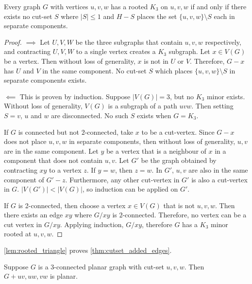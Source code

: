 \begin{lemma}\label{lem:rooted_triangle}
	Every graph $G$ with vertices $u, v, w$ has a rooted $K_3$ on $u, v, w$ if and only if there exists no cut-set $S$ where $|S| \leq 1$ and $H - S$ places the set $\{u,v,w\} \setminus S$ each in separate components. 
\end{lemma}
\begin{proof}
	$\implies$ Let $U,V,W$ be the three subgraphs that contain $u, v, w$ respectively, and contracting $U, V, W$ to a single vertex creates a $K_3$ subgraph. Let $x \in V(G)$ be a vertex. Then without loss of generality, $x$ is not in $U$ or $V$. Therefore, $G - x$ has $U$ and $V$ in the same component. No cut-set $S$ which places $\{u,v,w\} \setminus S$ in separate components exists. 

	$\impliedby$ This is proven by induction. Suppose $|V(G)| = 3$, but no $K_3$ minor exists. Without loss of generality, $V(G)$ is a subgraph of a path $uvw$. Then setting $S = v$, $u$ and $w$ are disconnected. No such $S$ exists when $G = K_3$. 

	If $G$ is connected but not $2$-connected, take $x$ to be a cut-vertex. Since $G - x$ does not place $u,v,w$ in separate components, then without loss of generality, $u,v$ are in the same component. Let $y$ be a vertex that is a neighbour of $x$ in a component that does not contain $u,v$. Let $G'$ be the graph obtained by contracting $xy$ to a vertex $z$. If $y = w$, then $z = w$. In $G'$, $u,v$ are also in the same component of $G' - z$. Furthermore, any other cut-vertex in $G'$ is also a cut-vertex in $G$. $|V(G')| < |V(G)|$, so induction can be applied on $G'$. 

	If $G$ is 2-connected, then choose a vertex $x \in V(G)$ that is not $u,v,w$. Then there exists an edge $xy$ where $G/xy$ is $2$-connected. Therefore, no vertex can be a cut vertex in $G/xy$. Applying induction, $G/xy$, therefore $G$ has a $K_3$ minor rooted at $u,v,w$.
\end{proof}


\cref{lem:rooted_triangle} proves \cref{thm:cutset_added_edges}. 

\begin{lemma}\label{thm:cutset_added_edges}
	Suppose $G$ is a $3$-connected planar graph with cut-set $u,v,w$. Then $G + uv, uw, vw$ is planar. 
\end{lemma}

